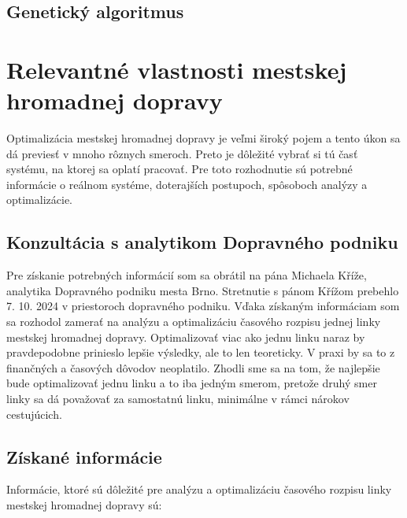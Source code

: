 \section{Genetický algoritmus}

\chapter{Relevantné vlastnosti mestskej hromadnej dopravy} %
\label{relevantne_vlastnosti}

Optimalizácia mestskej hromadnej dopravy je veľmi široký pojem a tento úkon sa dá previesť v mnoho rôznych smeroch.
Preto je dôležité vybrať si tú časť systému, na ktorej sa oplatí pracovať.
Pre toto rozhodnutie sú potrebné informácie o reálnom systéme, doterajších postupoch, spôsoboch analýzy a optimalizácie.

\section{Konzultácia s analytikom Dopravného podniku}
Pre získanie potrebných informácií som sa obrátil na pána Michaela Kříže, analytika Dopravného podniku mesta Brno.
Stretnutie s pánom Křížom prebehlo 7. 10. 2024 v priestoroch dopravného podniku.
Vďaka získaným informáciam som sa rozhodol zamerať na analýzu a optimalizáciu časového rozpisu jednej linky mestskej hromadnej dopravy.
Optimalizovať viac ako jednu linku naraz by pravdepodobne prinieslo lepšie výsledky, ale to len teoreticky.
V praxi by sa to z finančných a časových dôvodov neoplatilo.
Zhodli sme sa na tom, že najlepšie bude optimalizovať jednu linku a to iba jedným smerom, pretože druhý smer linky sa dá považovať za samostatnú linku, minimálne v rámci nárokov cestujúcich.

\section{Získané informácie}

Informácie, ktoré sú dôležité pre analýzu a optimalizáciu časového rozpisu linky mestskej hromadnej dopravy sú:

